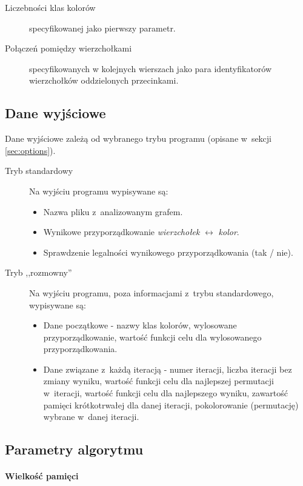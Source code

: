 \begin{description}
 \item [Liczebności klas kolorów] specyfikowanej jako pierwszy parametr. 
 \item [Połączeń pomiędzy wierzchołkami] specyfikowanych w kolejnych wierszach jako para identyfikatorów wierzchołków oddzielonych przecinkami.
\end{description}

\subsection{Dane wyjściowe}

Dane wyjściowe zależą od wybranego trybu programu (opisane w~sekcji \ref{sec:options}). 

\begin{description}
 \item [Tryb standardowy] Na wyjściu programu wypisywane są:
	\begin{itemize}
	 \item Nazwa pliku z~analizowanym grafem.
	 \item Wynikowe przyporządkowanie \emph{wierzchołek} $\leftrightarrow$ \emph{kolor}.
	 \item Sprawdzenie legalności wynikowego przyporządkowania (tak / nie).
	\end{itemize}
 \item [Tryb ,,rozmowny''] Na wyjściu programu, poza informacjami z~trybu standardowego, wypisywane są:
	\begin{itemize}
	 \item Dane początkowe - nazwy klas kolorów, wylosowane przyporządkowanie, wartość funkcji celu dla wylosowanego przyporządkowania.
	 \item Dane związane z~każdą iteracją - numer iteracji, liczba iteracji bez zmiany wyniku, wartość funkcji celu dla najlepszej permutacji w~iteracji, wartość funkcji celu dla najlepszego wyniku, zawartość pamięci krótkotrwałej dla danej iteracji, pokolorowanie (permutację) wybrane w~danej iteracji.
	\end{itemize}
\end{description}

\subsection{Parametry algorytmu}

\paragraph{Wielkość pamięci}

